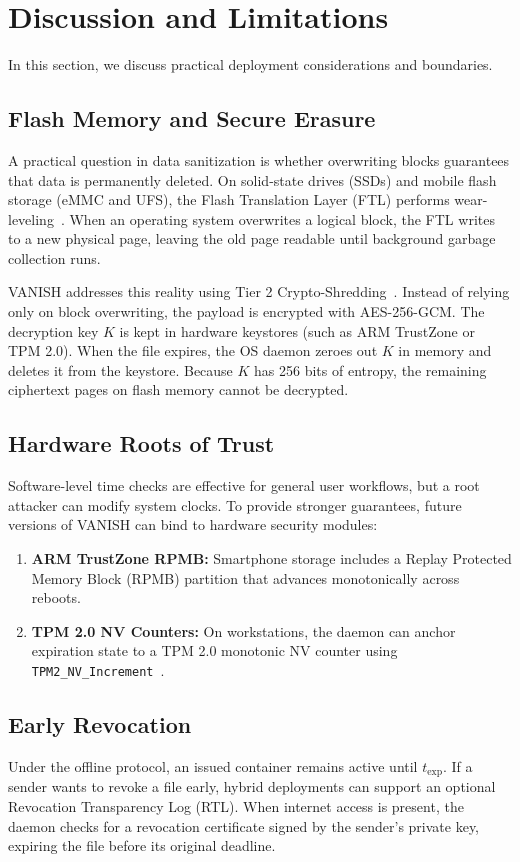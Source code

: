 \section{Discussion and Limitations}
\label{sec:discussion}

In this section, we discuss practical deployment considerations and boundaries.

\subsection{Flash Memory and Secure Erasure}
A practical question in data sanitization is whether overwriting blocks guarantees that data is permanently deleted. On solid-state drives (SSDs) and mobile flash storage (eMMC and UFS), the Flash Translation Layer (FTL) performs wear-leveling~\cite{wei2011reliably}. When an operating system overwrites a logical block, the FTL writes to a new physical page, leaving the old page readable until background garbage collection runs.

VANISH addresses this reality using Tier 2 Crypto-Shredding~\cite{diesburg2010survey, geambasu2011keymon}. Instead of relying only on block overwriting, the payload is encrypted with AES-256-GCM. The decryption key $K$ is kept in hardware keystores (such as ARM TrustZone or TPM 2.0). When the file expires, the OS daemon zeroes out $K$ in memory and deletes it from the keystore. Because $K$ has 256 bits of entropy, the remaining ciphertext pages on flash memory cannot be decrypted.

\subsection{Hardware Roots of Trust}
Software-level time checks are effective for general user workflows, but a root attacker can modify system clocks. To provide stronger guarantees, future versions of VANISH can bind to hardware security modules:
\begin{enumerate}
    \item \textbf{ARM TrustZone RPMB:} Smartphone storage includes a Replay Protected Memory Block (RPMB) partition that advances monotonically across reboots.
    \item \textbf{TPM 2.0 NV Counters:} On workstations, the daemon can anchor expiration state to a TPM 2.0 monotonic NV counter using \texttt{TPM2\_NV\_Increment}~\cite{tpm20specification}.
\end{enumerate}

\subsection{Early Revocation}
Under the offline protocol, an issued container remains active until $t_{\text{exp}}$. If a sender wants to revoke a file early, hybrid deployments can support an optional Revocation Transparency Log (RTL). When internet access is present, the daemon checks for a revocation certificate signed by the sender's private key, expiring the file before its original deadline.

